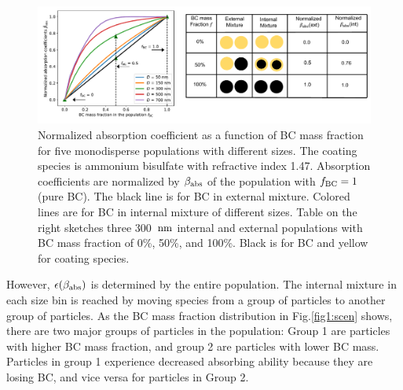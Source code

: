 \documentclass[edeposit,fullpage]{uiucthesis2009}
\makeatletter
\DeclareRobustCommand*\unit[1]
 {\ensuremath{%
   {\thinmuskip3mu\relax
    \def\mu{\text{\textmu}}\def~{\,}%
    \ifx\f@series\testbx\mathbf{#1}\else\mathrm{#1}\fi}}}
\makeatother
\begin{document}
\begin{figure}
	\centering
	\includegraphics[scale=0.5]{chap4_figs/fig5.pdf}
	\caption{Normalized absorption coefficient as a function of BC
          mass fraction for five monodisperse populations with
          different sizes. The coating species is ammonium bisulfate
          with refractive index 1.47. Absorption coefficients are
          normalized by $\beta_{\rm abs}$ of the population with
          $f_{\rm BC} = 1$ (pure BC). The black line is for BC in
          external mixture. Colored lines are for BC in internal
          mixture of different sizes. Table on the right sketches
          three 300~\unit{nm} internal and external populations with
          BC mass fraction of 0\%, 50\%, and 100\%. Black is for BC
          and yellow for coating species.}
	\label{fig5:abs-exp}
\end{figure}


However, $\epsilon(\beta_{\rm abs})$ is determined by the entire
population. The internal mixture in each size bin is reached by
moving species from a group of particles to another group of
particles.  As the BC mass fraction distribution  in
Fig.\ref{fig1:scen} shows, there are two major groups of particles in
the population: Group 1 are particles with higher BC mass fraction,
and group 2 are particles with lower BC mass. Particles in group 1
experience decreased absorbing ability because they are losing BC, and
vice versa for particles in Group 2.
\end{document}
